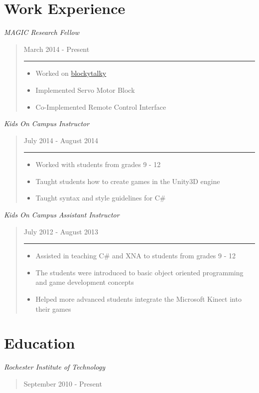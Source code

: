 \documentclass[line,margin]{res}
\begin{document}
\begin{resume}
\section{Work Experience}
\sl{MAGIC Research Fellow}
\begin{quote}
March 2014 - Present
\begin{center}\rule{3in}{0.4pt}\end{center}
\begin{itemize}
\itemsep1pt\parskip0pt
\item
  Worked on
  \href{https://github.com/liam-middlebrook/blockytalky.git}{blockytalky}
\item
  Implemented Servo Motor Block
\item
  Co-Implemented Remote Control Interface
\end{itemize}
\end{quote}
\sl{Kids On Campus
Instructor}
\begin{quote}
July 2014 - August 2014
\begin{center}\rule{3in}{0.4pt}\end{center}
\begin{itemize}
\itemsep1pt\parskip0pt
\item
  Worked with students from grades 9 - 12
\item
  Taught students how to create games in the Unity3D engine
\item
  Taught syntax and style guidelines for C\#
\end{itemize}
\end{quote}
\sl{Kids On Campus Assistant
Instructor}
\begin{quote}
July 2012 - August 2013
\begin{center}\rule{3in}{0.4pt}\end{center}
\begin{itemize}
\itemsep1pt\parskip0pt
\item
  Assisted in teaching C\# and XNA to students from grades 9 - 12
\item
  The students were introduced to basic object oriented programming and
  game development concepts
\item
  Helped more advanced students integrate the Microsoft Kinect into
  their games
\end{itemize}
\end{quote}
\section{Education}
\sl{Rochester Institute of
Technology}
\begin{quote}
September 2010 - Present

\end{quote}
\end{resume}
\end{document}
